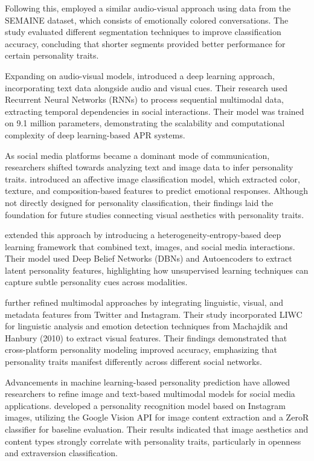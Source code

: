 Following this, \citet{Sidorov2014} employed a similar audio-visual approach using data from the SEMAINE dataset, which consists of emotionally colored conversations. The study evaluated different segmentation techniques to improve classification accuracy, concluding that shorter segments provided better performance for certain personality traits.

Expanding on audio-visual models, \citet{Lima2022} introduced a deep learning approach, incorporating text data alongside audio and visual cues. Their research used Recurrent Neural Networks (RNNs) to process sequential multimodal data, extracting temporal dependencies in social interactions. Their model was trained on 9.1 million parameters, demonstrating the scalability and computational complexity of deep learning-based APR systems.

As social media platforms became a dominant mode of communication, researchers shifted towards analyzing text and image data to infer personality traits. \citet{Machajdik2010} introduced an affective image classification model, which extracted color, texture, and composition-based features to predict emotional responses. Although not directly designed for personality classification, their findings laid the foundation for future studies connecting visual aesthetics with personality traits.

\citet{Xianyu2016} extended this approach by introducing a heterogeneity-entropy-based deep learning framework that combined text, images, and social media interactions. Their model used Deep Belief Networks (DBNs) and Autoencoders to extract latent personality features, highlighting how unsupervised learning techniques can capture subtle personality cues across modalities.

\citet{Skowron2016} further refined multimodal approaches by integrating linguistic, visual, and metadata features from Twitter and Instagram. Their study incorporated LIWC for linguistic analysis and emotion detection techniques from Machajdik and Hanbury (2010) to extract visual features. Their findings demonstrated that cross-platform personality modeling improved accuracy, emphasizing that personality traits manifest differently across different social networks.

Advancements in machine learning-based personality prediction have allowed researchers to refine image and text-based multimodal models for social media applications. \citet{Ferwerda2018} developed a personality recognition model based on Instagram images, utilizing the Google Vision API for image content extraction and a ZeroR classifier for baseline evaluation. Their results indicated that image aesthetics and content types strongly correlate with personality traits, particularly in openness and extraversion classification.

